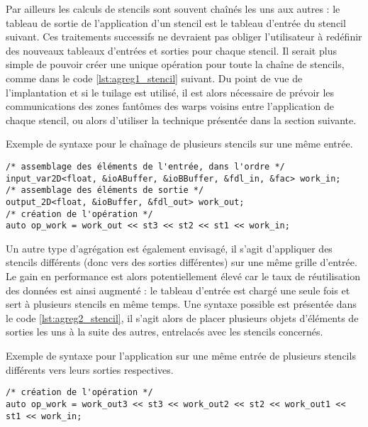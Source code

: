 Par ailleurs les calculs de stencils sont souvent chaînés les uns aux autres : le tableau de sortie de l'application d'un stencil est le tableau d'entrée du stencil suivant. Ces traitements successifs ne devraient pas obliger l'utilisateur à redéfinir des nouveaux tableaux d'entrées et sorties pour chaque stencil. Il serait plus simple de pouvoir créer une unique opération pour toute la chaîne de stencils, comme dans le code \ref{lst:agreg1_stencil} suivant. Du point de vue de l'implantation et si le tuilage est utilisé, il est alors nécessaire de prévoir les communications des zones fantômes des warps voisins entre l'application de chaque stencil, ou alors d'utiliser la technique présentée dans la section suivante.

\begin{listing}[H]
\caption{Exemple de syntaxe pour le chaînage de plusieurs stencils sur une même entrée.}
\label{lst:agreg1_stencil}
\begin{verbatim}
/* assemblage des éléments de l'entrée, dans l'ordre */
input_var2D<float, &ioABuffer, &ioBBuffer, &fdl_in, &fac> work_in;
/* assemblage des éléments de sortie */
output_2D<float, &ioBuffer, &fdl_out> work_out;
/* création de l'opération */
auto op_work = work_out << st3 << st2 << st1 << work_in;
\end{verbatim}
\end{listing}

Un autre type d'agrégation est également envisagé, il s'agit d'appliquer des stencils différents (donc vers des sorties différentes) sur une même grille d'entrée. Le gain en performance est alors potentiellement élevé car le taux de réutilisation des données est ainsi augmenté : le tableau d'entrée est chargé une seule fois et sert à plusieurs stencils en même temps. Une syntaxe possible est présentée dans le code \ref{lst:agreg2_stencil}, il s'agit alors de placer plusieurs objets d'éléments de sorties les uns à la suite des autres, entrelacés avec les stencils concernés. 

\begin{listing}[H]
\caption{Exemple de syntaxe pour l'application sur une même entrée de plusieurs stencils différents vers leurs sorties respectives.}
\label{lst:agreg2_stencil}
\begin{verbatim}
/* création de l'opération */
auto op_work = work_out3 << st3 << work_out2 << st2 << work_out1 << st1 << work_in;
\end{verbatim}
\end{listing}

